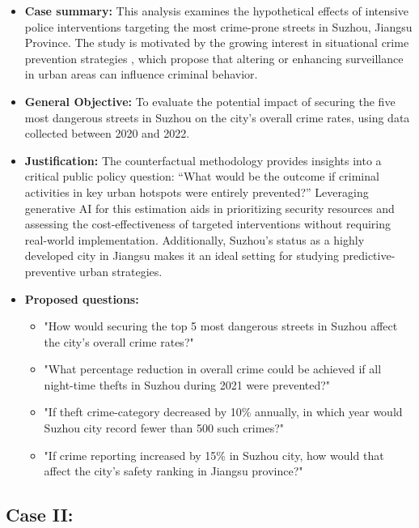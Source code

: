 \begin{itemize}
    \item \textbf{Case summary:} This analysis examines the hypothetical effects of intensive police interventions targeting the most crime-prone streets in Suzhou, Jiangsu Province. The study is motivated by the growing interest in situational crime prevention strategies \cite{clarke1995situational}, which propose that altering or enhancing surveillance in urban areas can influence criminal behavior. 
        \item \textbf{General Objective:} To evaluate the potential impact of securing the five most dangerous streets in Suzhou on the city’s overall crime rates, using data collected between 2020 and 2022.
        \item \textbf{Justification:} The counterfactual methodology provides insights into a critical public policy question: “What would be the outcome if criminal activities in key urban hotspots were entirely prevented?” Leveraging generative AI for this estimation aids in prioritizing security resources and assessing the cost-effectiveness of targeted interventions without requiring real-world implementation. Additionally, Suzhou’s status as a highly developed city in Jiangsu makes it an ideal setting for studying predictive-preventive urban strategies.
        \item \textbf{Proposed questions:}
        \begin{itemize}
            \item "How would securing the top 5 most dangerous streets in Suzhou affect the city’s overall crime rates?"
            \item "What percentage reduction in overall crime could be achieved if all night-time thefts in Suzhou during 2021 were prevented?"
            \item "If theft crime-category decreased by 10\% annually, in which year would Suzhou city record fewer than 500 such crimes?"
            \item "If crime reporting increased by 15\% in Suzhou city, how would that affect the city's safety ranking in Jiangsu province?"
        \end{itemize}




\end{itemize}


\subsection{Case II:}

